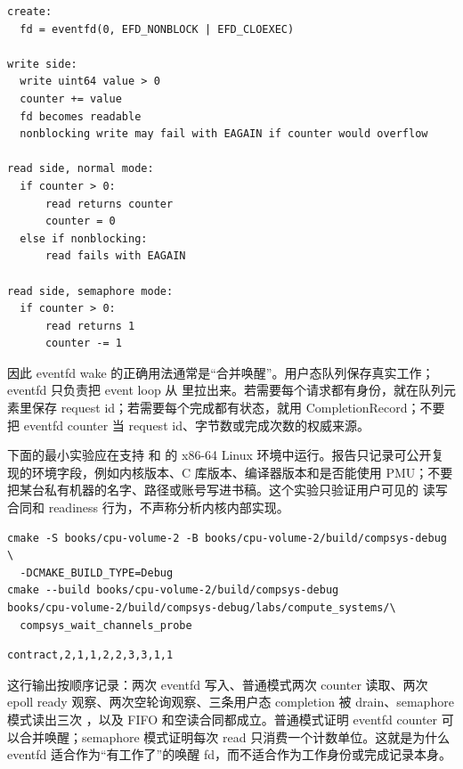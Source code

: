 \begin{lstlisting}[numbers=none,caption={eventfd read/write 的基本语义}]
create:
  fd = eventfd(0, EFD_NONBLOCK | EFD_CLOEXEC)

write side:
  write uint64 value > 0
  counter += value
  fd becomes readable
  nonblocking write may fail with EAGAIN if counter would overflow

read side, normal mode:
  if counter > 0:
      read returns counter
      counter = 0
  else if nonblocking:
      read fails with EAGAIN

read side, semaphore mode:
  if counter > 0:
      read returns 1
      counter -= 1
\end{lstlisting}

因此 eventfd wake 的正确用法通常是“合并唤醒”。用户态队列保存真实工作；eventfd 只负责把 event loop 从  里拉出来。若需要每个请求都有身份，就在队列元素里保存 request id；若需要每个完成都有状态，就用 CompletionRecord；不要把 eventfd counter 当 request id、字节数或完成次数的权威来源。

下面的最小实验应在支持  和  的 x86-64 Linux 环境中运行。报告只记录可公开复现的环境字段，例如内核版本、C 库版本、编译器版本和是否能使用 PMU；不要把某台私有机器的名字、路径或账号写进书稿。这个实验只验证用户可见的  读写合同和  readiness 行为，不声称分析内核内部实现。

\begin{lstlisting}[numbers=none,caption={eventfd/epoll 合同实验命令}]
cmake -S books/cpu-volume-2 -B books/cpu-volume-2/build/compsys-debug \
  -DCMAKE_BUILD_TYPE=Debug
cmake --build books/cpu-volume-2/build/compsys-debug
books/cpu-volume-2/build/compsys-debug/labs/compute_systems/\
  compsys_wait_channels_probe
\end{lstlisting}

\begin{lstlisting}[numbers=none,caption={eventfd 读写实验输出摘要}]
contract,2,1,1,2,2,3,3,1,1
\end{lstlisting}

这行输出按顺序记录：两次 eventfd 写入、普通模式两次 counter 读取、两次 epoll ready 观察、两次空轮询观察、三条用户态 completion 被 drain、semaphore 模式读出三次 ，以及 FIFO 和空读合同都成立。普通模式证明 eventfd counter 可以合并唤醒；semaphore 模式证明每次 read 只消费一个计数单位。这就是为什么 eventfd 适合作为“有工作了”的唤醒 fd，而不适合作为工作身份或完成记录本身。

